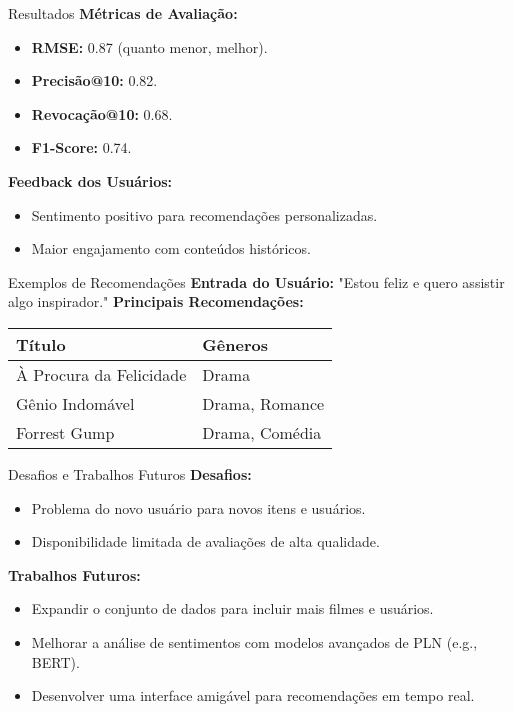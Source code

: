 \documentclass{beamer}
\begin{document}
\begin{frame}{Resultados}
    \textbf{Métricas de Avaliação:}
    \begin{itemize}
        \item \textbf{RMSE:} 0.87 (quanto menor, melhor).
        \item \textbf{Precisão@10:} 0.82.
        \item \textbf{Revocação@10:} 0.68.
        \item \textbf{F1-Score:} 0.74.
    \end{itemize}
    \vspace{0.5cm}
    \textbf{Feedback dos Usuários:}
    \begin{itemize}
        \item Sentimento positivo para recomendações personalizadas.
        \item Maior engajamento com conteúdos históricos.
    \end{itemize}
\end{frame}

\begin{frame}{Exemplos de Recomendações}
    \textbf{Entrada do Usuário:} "Estou feliz e quero assistir algo inspirador."
    \vspace{0.5cm}
    \textbf{Principais Recomendações:}
    \begin{tabular}{ll}
        \toprule
        \textbf{Título} & \textbf{Gêneros} \\
        \midrule
        À Procura da Felicidade & Drama \\
        Gênio Indomável & Drama, Romance \\
        Forrest Gump & Drama, Comédia \\
        \bottomrule
    \end{tabular}
\end{frame}

\begin{frame}{Desafios e Trabalhos Futuros}
    \textbf{Desafios:}
    \begin{itemize}
        \item Problema do novo usuário para novos itens e usuários.
        \item Disponibilidade limitada de avaliações de alta qualidade.
    \end{itemize}
    \vspace{0.5cm}
    \textbf{Trabalhos Futuros:}
    \begin{itemize}
        \item Expandir o conjunto de dados para incluir mais filmes e usuários.
        \item Melhorar a análise de sentimentos com modelos avançados de PLN (e.g., BERT).
        \item Desenvolver uma interface amigável para recomendações em tempo real.
    \end{itemize}
\end{frame}
\end{document}
